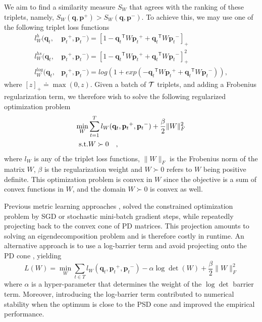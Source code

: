 \documentclass{article} %
\newcommand\mat[1]{{#1}}
\renewcommand\vec[1]{\mathbf{#1}}
\newcommand{\T}{{}^\mathsf{T}}
\newcommand{\W}{\mat{W}}
\newcommand{\eqdef}{\doteq}
\newcommand{\frobsq}[1]{{\|#1\|_F^2}}
\newcommand{\frob}[1]{{\|#1\|_F}}
\newcommand{\q}{{\vec{q}}}
\newcommand{\p}{{\vec{p}}}
\newcommand{\trip}{{t}}
\newcommand{\qt}{{\q_{\trip}}}
\newcommand{\pt}{{\p_{\trip}}}
\begin{document}
We aim to find a similarity measure $S_{\W}$ that agrees with the ranking of these triplets, namely, $S_{\W}(\q, \p^{+}) > S_{\W}(\q,
\p^{-})$. To achieve this, we may use one of the following triplet loss functions
\begin{align}
\label{single-triplet-lossed}
l_{\W}^h(\qt, &\pt^{+}, \pt^{-}) = [1-\qt\T\W\pt^+ + \qt\T\W\pt^-]_{+}
 \\ \nonumber
l_{\W}^{hs}(\qt, &\pt^+, \pt^-) = [1-\qt\T\W\pt^+ + \qt\T\W\pt^-]_{+}^2
 \\ \nonumber
l_{\W}^{log}(\qt, &\pt^+, \pt^-) = log(1+exp(-\qt\T\W\pt^+ + \qt\T\W\pt^-)) \nonumber ,
\end{align}
where $[z]_{+} \eqdef \max(0,z)$. Given a batch of $\cal{T}$ triplets, and adding a Frobenius regularization term, we therefore wish to solve the following regularized optimization problem
\begin{eqnarray}
  \min_{\W}& \sum_{\trip=1}^T  l_{\W}(\qt, \pt^+, \pt^-) + \frac{\beta}{2} \frobsq{\W}
 \\  \nonumber
   \rm{s.t.}& \W \succ 0 \quad,
\label{hingelt}
\end{eqnarray}
where $l_{\W}$ is any of the triplet loss functions, $\frob{\W}$ is the Frobenius norm of the matrix $\W$, $\beta$ is the regularization weight and $\W \succ 0$ refers to $\W$ being positive definite. This optimization problem is convex in $\W$ since the objective is a sum of convex functions in $\W$, and the domain $\W \succ 0$ is convex as well.

Previous metric learning approaches \cite{OASIS, qianHD, qian}, solved the constrained optimization problem by SGD or stochastic mini-batch gradient steps, while repeatedly projecting back to the convex cone of PD matrices. This projection amounts to solving an eigendecomposition problem and is therefore costly in runtime. An alternative approach is to use a log-barrier term and avoid projecting onto the PD cone \cite{davis2007information,lego}, yielding
\begin{equation}
\label{eq-logdet-loss}
L(W) = 
  \min_{\W} \sum_{\trip \in T}  l_{\W}(\qt, \pt^+, \pt^-) - \alpha \log \det(\W) + \frac{\beta}{2} \frobsq{\W}
\end{equation}
where $\alpha$ is a hyper-parameter that determines the weight of the
$\log \det$ barrier term. Moreover, introducing the log-barrier term contributed to numerical stability when the optimum is close to the PSD cone and improved the empirical performance.
\end{document}
